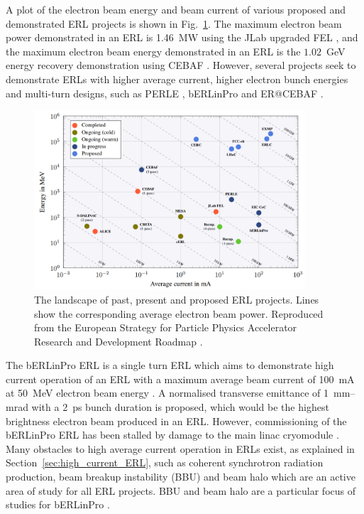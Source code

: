 \documentclass[../main.tex]{subfiles}
\begin{document}
A plot of the electron beam energy and beam current of various proposed and demonstrated ERL projects is shown in Fig.~\ref{fig:ERL_Landscape}. The maximum electron beam power demonstrated in an ERL is 1.46~\si{\mega\watt} using the JLab upgraded FEL \cite{neil2006jlab}, and the maximum electron beam energy demonstrated in an ERL is the $1.02$~\si{\giga\electronvolt} energy recovery demonstration using CEBAF \cite{bogacz2003cebaf,tennant2003beam}. However, several projects seek to demonstrate ERLs with higher average current, higher electron bunch energies and multi-turn designs, such as PERLE \cite{angal2018perle}, bERLinPro \cite{kuske2012conceptual} and ER@CEBAF \cite{meot2016er}.
\begin{figure}[!h]
\centering
\includegraphics[width=0.9\textwidth]{Figures/CBETA_Multi-Pass_Commissioning/Tennant_ERL_Landscape.pdf}
\caption{The landscape of past, present and proposed ERL projects. Lines show the corresponding average electron beam power. Reproduced from the European Strategy for Particle Physics
Accelerator Research and Development Roadmap \cite{adolphsen2022european}.}
\label{fig:ERL_Landscape}
\end{figure}

The bERLinPro ERL is a single turn ERL which aims to demonstrate high current operation of an ERL with a maximum average beam current of 100~\si{\milli\ampere} at 50~\si{\mega\electronvolt} electron beam energy \cite{kuske2012conceptual,neumann2018berlinpro}. A normalised transverse emittance of 1~\si{\milli\meter}--\si{\milli\radian} with a 2~\si{\pico\second} bunch duration is proposed, which would be the highest brightness electron beam produced in an ERL. However, commissioning of the bERLinPro ERL has been stalled by damage to the main linac cryomodule \cite{neumann2018berlinpro}. Many obstacles to high average current operation in ERLs exist, as explained in Section~\ref{sec:high_current_ERL}, such as coherent synchrotron radiation production, beam breakup instability (BBU) and beam halo which are an active area of study for all ERL projects. BBU and beam halo are a particular focus of studies for bERLinPro \cite{neumann2012status,hwang2019first}.
\end{document}
